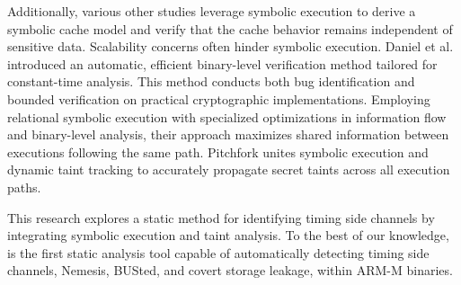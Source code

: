 Additionally, various other studies \cite{sung2018canal,
chattopadhyay2018symbolic, brotzman2019casym} leverage symbolic execution
to derive a symbolic cache model and verify that the cache behavior remains
independent of sensitive data. Scalability concerns often hinder symbolic
execution. Daniel et al. \cite{binsec} introduced an automatic, efficient
binary-level verification method tailored for constant-time analysis. This
method conducts both bug identification and bounded verification on
practical cryptographic implementations. Employing relational symbolic
execution with specialized optimizations in information flow and
binary-level analysis, their approach maximizes shared information between
executions following the same path. Pitchfork \cite{pitchfork} unites
symbolic execution and dynamic taint tracking to accurately propagate
secret taints across all execution paths.


This research explores a static method for identifying timing side channels
by integrating symbolic execution and taint analysis. To the best of our
knowledge, \tool{} is the first static analysis tool capable of
automatically detecting timing side channels, Nemesis, BUSted, and covert
storage leakage, within ARM-M binaries.
